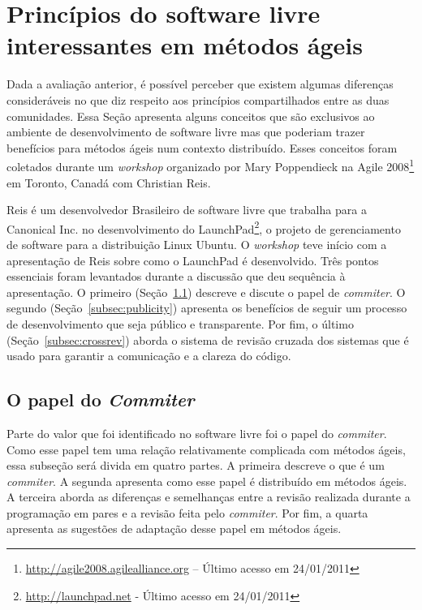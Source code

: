 \section{Princípios do software livre interessantes em métodos ágeis}
\label{sec:foss-over-agile}

Dada a avaliação anterior, é possível perceber que existem algumas
diferenças consideráveis no que diz respeito aos princípios
compartilhados entre as duas comunidades. Essa Seção apresenta alguns
conceitos que são exclusivos ao ambiente de desenvolvimento de
software livre mas que poderiam trazer benefícios para métodos ágeis
num contexto distribuído. Esses conceitos foram coletados durante um
\emph{workshop} organizado por Mary Poppendieck na Agile
2008\footnote{\url{http://agile2008.agilealliance.org} -- Último
  acesso em 24/01/2011} em Toronto, Canadá com Christian Reis.

Reis é um desenvolvedor Brasileiro de software livre que trabalha para
a Canonical Inc. no desenvolvimento do
LaunchPad\footnote{\url{http://launchpad.net} - Último acesso em
  24/01/2011}, o projeto de gerenciamento de software para a
distribuição Linux Ubuntu. O \emph{workshop} teve início com a
apresentação de Reis sobre como o LaunchPad é desenvolvido. Três
pontos essenciais foram levantados durante a discussão que deu
sequência à apresentação. O primeiro (Seção~\ref{subsec:commiter})
descreve e discute o papel de \emph{commiter}.  O segundo
(Seção~\ref{subsec:publicity}) apresenta os benefícios de seguir um
processo de desenvolvimento que seja público e transparente.  Por fim,
o último (Seção~\ref{subsec:crossrev}) aborda o sistema de revisão
cruzada dos sistemas que é usado para garantir a comunicação e a
clareza do código.

\subsection{O papel do \emph{Commiter}}
\label{subsec:commiter}

Parte do valor que foi identificado no software livre foi o papel do
\emph{commiter}. Como esse papel tem uma relação relativamente
complicada com métodos ágeis, essa subseção será divida em quatro
partes. A primeira descreve o que é um \emph{commiter}. A segunda
apresenta como esse papel é distribuído em métodos ágeis. A terceira
aborda as diferenças e semelhanças entre a revisão realizada durante a
programação em pares e a revisão feita pelo \emph{commiter}. Por fim,
a quarta apresenta as sugestões de adaptação desse papel em métodos
ágeis.

